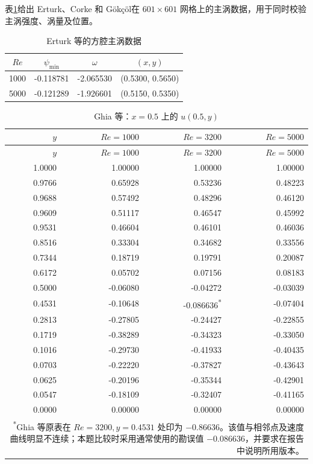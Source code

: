 \documentclass[UTF8,a4paper,11pt]{ctexart}
\begin{document}
表\ref{tab:erturk-primary}给出 Erturk、Corke 和 G\"ok\c{c}\"ol\cite{Erturk2005}在 \(601\times601\) 网格上的主涡数据，用于同时校验主涡强度、涡量及位置。

\begin{table}[htbp]
\centering
\caption{Erturk 等\cite{Erturk2005}的方腔主涡数据}
\label{tab:erturk-primary}
\begin{tabular}{cccc}
\toprule
\(Re\) & \(\psi_{\min}\) & \(\omega\) & \((x,y)\) \\
\midrule
1000 & -0.118781 & -2.065530 & (0.5300, 0.5650) \\
5000 & -0.121289 & -1.926601 & (0.5150, 0.5350) \\
\bottomrule
\end{tabular}
\end{table}

\begin{longtable}{r|rrr}
\caption{Ghia 等\cite{Ghia1982}：\(x=0.5\) 上的 \(u(0.5,y)\)}
\label{tab:ghia-u}\\
\toprule
\(y\) & \(Re=1000\) & \(Re=3200\) & \(Re=5000\) \\
\midrule
\endfirsthead
\toprule
\(y\) & \(Re=1000\) & \(Re=3200\) & \(Re=5000\) \\
\midrule
\endhead
1.0000 & 1.00000 & 1.00000 & 1.00000 \\
0.9766 & 0.65928 & 0.53236 & 0.48223 \\
0.9688 & 0.57492 & 0.48296 & 0.46120 \\
0.9609 & 0.51117 & 0.46547 & 0.45992 \\
0.9531 & 0.46604 & 0.46101 & 0.46036 \\
0.8516 & 0.33304 & 0.34682 & 0.33556 \\
0.7344 & 0.18719 & 0.19791 & 0.20087 \\
0.6172 & 0.05702 & 0.07156 & 0.08183 \\
0.5000 & -0.06080 & -0.04272 & -0.03039 \\
0.4531 & -0.10648 & -0.086636\textsuperscript{*} & -0.07404 \\
0.2813 & -0.27805 & -0.24427 & -0.22855 \\
0.1719 & -0.38289 & -0.34323 & -0.33050 \\
0.1016 & -0.29730 & -0.41933 & -0.40435 \\
0.0703 & -0.22220 & -0.37827 & -0.43643 \\
0.0625 & -0.20196 & -0.35344 & -0.42901 \\
0.0547 & -0.18109 & -0.32407 & -0.41165 \\
0.0000 & 0.00000 & 0.00000 & 0.00000 \\
\bottomrule
\multicolumn{4}{p{0.88\textwidth}}{\footnotesize \textsuperscript{*}Ghia 等原表在 \(Re=3200,y=0.4531\) 处印为 \(-0.86636\)。该值与相邻点及速度曲线明显不连续；本题比较时采用通常使用的勘误值 \(-0.086636\)，并要求在报告中说明所用版本。}
\end{longtable}
\end{document}
